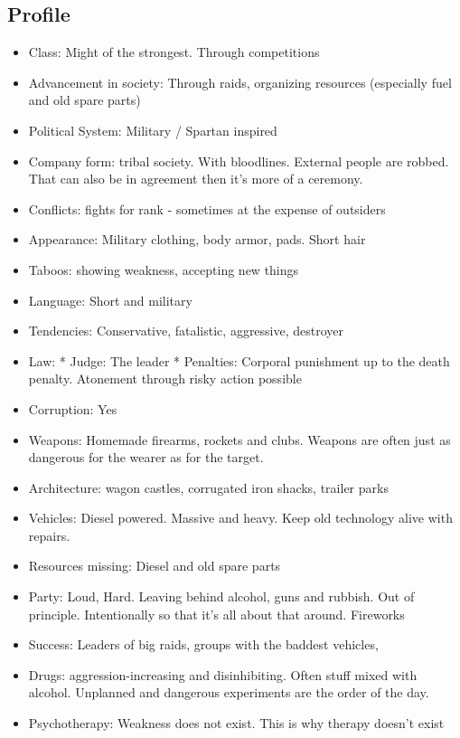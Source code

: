 \subsection{Profile}
\begin{itemize}
    \item Class: Might of the strongest. Through competitions
    \item Advancement in society: Through raids, organizing resources (especially fuel and old spare parts)
    \item Political System: Military / Spartan inspired
    \item Company form: tribal society. With bloodlines. External people are robbed. That can also be in agreement then it's more of a ceremony.
    \item Conflicts: fights for rank - sometimes at the expense of outsiders
    \item Appearance: Military clothing, body armor, pads. Short hair
    \item Taboos: showing weakness, accepting new things
    \item Language: Short and military
    \item Tendencies: Conservative, fatalistic, aggressive, destroyer
    \item Law: * Judge: The leader * Penalties: Corporal punishment up to the death penalty. Atonement through risky action possible
    \item Corruption: Yes
    \item Weapons: Homemade firearms, rockets and clubs. Weapons are often just as dangerous for the wearer as for the target.
    \item Architecture: wagon castles, corrugated iron shacks, trailer parks
    \item Vehicles: Diesel powered. Massive and heavy. Keep old technology alive with repairs.
    \item Resources missing: Diesel and old spare parts
    \item Party: Loud, Hard. Leaving behind alcohol, guns and rubbish. Out of principle. Intentionally so that it's all about that around. Fireworks
    \item Success: Leaders of big raids, groups with the baddest vehicles,
    \item Drugs: aggression-increasing and disinhibiting. Often stuff mixed with alcohol. Unplanned and dangerous experiments are the order of the day.
    \item Psychotherapy: Weakness does not exist. This is why therapy doesn't exist

\end{itemize}
